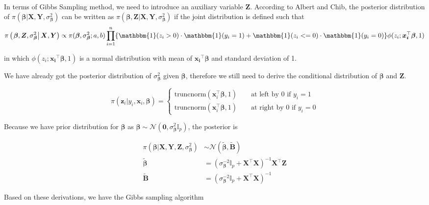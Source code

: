 \documentclass[12pt]{article}
\begin{document}
In terms of Gibbs Sampling method, we need to introduce an auxiliary variable $\bm{Z}$. According to Albert and Chib\cite{gibbs}, the posterior distribution of $\pi\left(\left.\bm{\beta}\right\vert \bm{X}, \bm{Y}, \sigma_{\bm{\beta}}^2 \right)$ can be written as $\pi\left(\left.\bm{\beta}, \bm{Z}\right\vert \bm{X}, \bm{Y}, \sigma_{\bm{\beta}}^2\right)$ if the joint distribution is defined such that
\[ \pi\left(\left.\bm{\beta}, \bm{Z}, \sigma_{\bm{\beta}}^2\right\vert \bm{X}, \bm{Y}\right) \propto \pi(\bm{\beta}, \sigma^2_{\bm{\beta}}; a,b) \prod_{i=1}^{n} \{\mathbbm{1}(z_i > 0)\cdot \mathbbm{1}(y_i = 1) +\mathbbm{1}(z_i <= 0)\cdot \mathbbm{1}(y_i = 0) \} \phi(z_i; \bm{x_i}^\top \bm{\beta}, 1) \]

in which $\phi(z_i; \bm{x_i}^\top \bm{\beta}, 1)$ is a normal distribution with mean of $\bm{x_i}^\top \bm{\beta}$ and standard deviation of 1.

We have already got the posterior distribution of $\sigma_{\bm{\beta}}^2$ given $\bm{\beta}$, therefore we still need to derive the conditional distribution of $\bm{\beta}$ and $\bm{Z}$.

\[  \pi\left(\left.\bm{z}_i\right\vert y_i, \bm{x}_i, \bm{\beta} \right) = \begin{cases}
	\text{truncnorm}(\bm{x}_i^\top \bm{\beta}, 1)\qquad \text{at left by 0 if } y_i=1\\
	\text{truncnorm}(\bm{x}_i^\top \bm{\beta}, 1)\qquad \text{at right by 0 if } y_i=0
\end{cases}\]

Because we have prior distribution for $\bm{\beta}$ as $\bm{\beta} \sim \mathcal{N}(\bm{0}, \sigma^2_{\bm{\beta}} \mathbb{I}_p)$, the posterior is  

\begin{align*}
	\pi \left(\left.\bm{\beta}\right\vert \bm{X}, \bm{Y}, \bm{Z}, \sigma^2_{\bm{\beta}} \right) &\sim \mathcal{N}(\tilde{\bm{\beta}}, \tilde{\bm{B}})\\
	\tilde{\bm{\beta}} &= \left(\sigma^{-2}_{\bm{\beta}} \mathbb{I}_p +\bm{X}^\top \bm{X}\right)^{-1}\bm{X}^\top \bm{Z}\\
	\tilde{\bm{B}} &= \left(\sigma^{-2}_{\bm{\beta}} \mathbb{I}_p +\bm{X}^\top \bm{X}\right)^{-1}
\end{align*}

Based on these derivations, we have the Gibbs sampling algorithm
\end{document}
